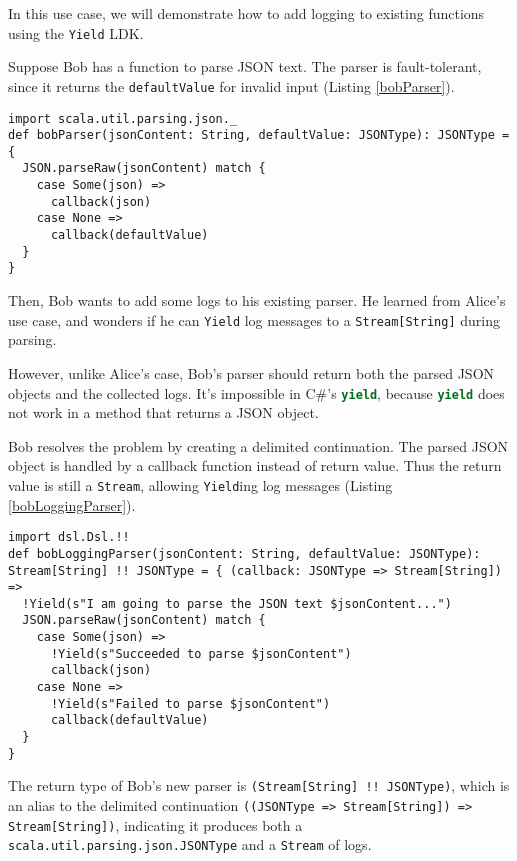 In this use case, we will demonstrate how to add logging to existing functions using the \lstinline{Yield} LDK.

Suppose Bob has a function to parse JSON text. The parser is fault-tolerant, since it returns the \lstinline{defaultValue} for invalid input  (Listing \ref{bobParser}).

\begin{lstlisting}[caption={The original implementation of Bob's parser},label={bobParser}]
import scala.util.parsing.json._
def bobParser(jsonContent: String, defaultValue: JSONType): JSONType = {
  JSON.parseRaw(jsonContent) match {
    case Some(json) =>
      callback(json)
    case None =>
      callback(defaultValue)
  }
}
\end{lstlisting}

Then, Bob wants to add some logs to his existing parser. He learned from Alice's use case, and wonders if he can \lstinline{Yield} log messages to a \lstinline{Stream[String]} during parsing.

However, unlike Alice's case, Bob's parser should return both the parsed JSON objects and the collected logs. It's impossible in C\#'s \lstinline[language=Python]{yield}, because \lstinline[language=Python]{yield} does not work in a method that returns a JSON object.

Bob resolves the problem by creating a delimited continuation. The parsed JSON object is handled by a callback function instead of return value. Thus the return value is still a \lstinline{Stream}, allowing \lstinline{Yield}ing log messages (Listing \ref{bobLoggingParser}).

\begin{lstlisting}[caption={The implementation of Bob's logging parser},label={bobLoggingParser}]
import dsl.Dsl.!!
def bobLoggingParser(jsonContent: String, defaultValue: JSONType): Stream[String] !! JSONType = { (callback: JSONType => Stream[String]) =>
  !Yield(s"I am going to parse the JSON text $jsonContent...")
  JSON.parseRaw(jsonContent) match {
    case Some(json) =>
      !Yield(s"Succeeded to parse $jsonContent")
      callback(json)
    case None =>
      !Yield(s"Failed to parse $jsonContent")
      callback(defaultValue)
  }
}
\end{lstlisting}

The return type of Bob's new parser is \lstinline{(Stream[String] !! JSONType)}, which is an alias to the delimited continuation \lstinline{((JSONType => Stream[String]) => Stream[String])}, indicating it produces both a \lstinline{scala.util.parsing.json.JSONType} and a \lstinline{Stream} of logs.

